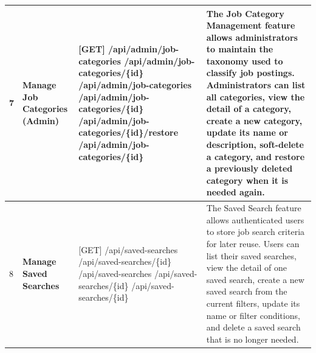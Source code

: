 \begin{longtable}{|C{0.7cm}|L{2.6cm}|S{6.6cm}|L{5.2cm}|}
7
&
\textbf{Manage Job Categories (Admin)}
&
[GET] /\allowbreak{}api/\allowbreak{}admin/\allowbreak{}job-categories \newline
[GET] /\allowbreak{}api/\allowbreak{}admin/\allowbreak{}job-categories/\allowbreak{}\{id\} \newline
[POST] /\allowbreak{}api/\allowbreak{}admin/\allowbreak{}job-categories \newline
[PATCH] /\allowbreak{}api/\allowbreak{}admin/\allowbreak{}job-categories/\allowbreak{}\{id\} \newline
[PATCH] /\allowbreak{}api/\allowbreak{}admin/\allowbreak{}job-categories/\allowbreak{}\{id\}/\allowbreak{}restore \newline
[DELETE] /\allowbreak{}api/\allowbreak{}admin/\allowbreak{}job-categories/\allowbreak{}\{id\}
&
The Job Category Management feature allows administrators to maintain the taxonomy used to classify job postings. Administrators can list all categories, view the detail of a category, create a new category, update its name or description, soft-delete a category, and restore a previously deleted category when it is needed again.
\\ \hline

8
&
\textbf{Manage Saved Searches}
&
[GET] /\allowbreak{}api/\allowbreak{}saved-searches \newline
[GET] /\allowbreak{}api/\allowbreak{}saved-searches/\allowbreak{}\{id\} \newline
[POST] /\allowbreak{}api/\allowbreak{}saved-searches \newline
[PATCH] /\allowbreak{}api/\allowbreak{}saved-searches/\allowbreak{}\{id\} \newline
[DELETE] /\allowbreak{}api/\allowbreak{}saved-searches/\allowbreak{}\{id\}
&
The Saved Search feature allows authenticated users to store job search criteria for later reuse. Users can list their saved searches, view the detail of one saved search, create a new saved search from the current filters, update its name or filter conditions, and delete a saved search that is no longer needed.
\\ \hline


\end{longtable}

